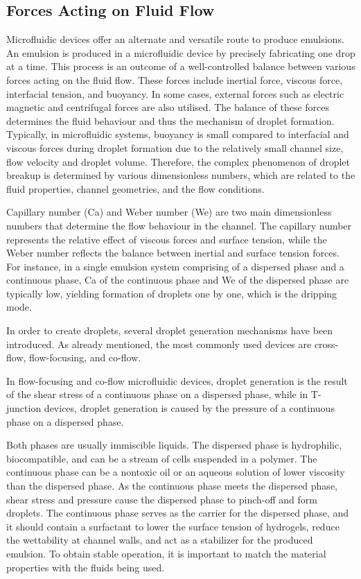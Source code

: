 \subsection{Forces Acting on Fluid Flow}
Microfluidic devices offer an alternate and versatile route to produce emulsions. An emulsion is produced in a microfluidic device by precisely fabricating one drop at a time. This process is an outcome of a well-controlled balance between various forces acting on the fluid flow. These forces include inertial force, viscous force, interfacial tension, and buoyancy. In some cases, external forces such as electric magnetic and centrifugal forces are also utilised. The balance of these forces determines the fluid behaviour and thus the mechanism of droplet formation. Typically, in microfluidic systems, buoyancy is small compared to interfacial and viscous forces during droplet formation due to the relatively small channel size, flow velocity and droplet volume. Therefore, the complex phenomenon of droplet breakup is determined by various dimensionless numbers, which are related to the fluid properties, channel geometries, and the flow conditions. \parencite{Zhang2016,Zhu2019,Zhu2017}

Capillary number (Ca) and Weber number (We) are two main dimensionless numbers that determine the flow behaviour in the channel. The capillary number represents the relative effect of viscous forces and surface tension, while the Weber number reflects the balance between inertial and surface tension forces. For instance, in a single emulsion system comprising of a dispersed phase and a continuous phase, Ca of the continuous phase and We of the dispersed phase are typically low, yielding formation of droplets one by one, which is the dripping mode. \parencite{Zhang2016,Zhu2019,Zhu2017}
\blankline

\noindent In order to create droplets, several droplet generation mechanisms have been introduced. As already mentioned, the most commonly used devices are cross-flow, flow-focusing, and co-flow. \parencite{Zhu2017,Pit2015}

In flow-focusing and co-flow microfluidic devices, droplet generation is the result of the shear stress of a continuous phase on a dispersed phase, while in T-junction devices, droplet generation is caused by the pressure of a continuous phase on a dispersed phase. \parencite{Zhu2019,Zhu2017}

Both phases are usually immiscible liquids. The dispersed phase is hydrophilic, biocompatible, and can be a stream of cells suspended in a polymer. The continuous phase can be a nontoxic oil or an aqueous solution of lower viscosity than the dispersed phase. As the continuous phase meets the dispersed phase, shear stress and pressure cause the dispersed phase to pinch-off and form droplets. The continuous phase serves as the carrier for the dispersed phase, and it should contain a surfactant to lower the surface tension of hydrogels, reduce the wettability at channel walls, and act as a stabilizer for the produced emulsion.
To obtain stable operation, it is important to match the material properties with the fluids being used.\parencite{Zhu2019,Zhu2017}

